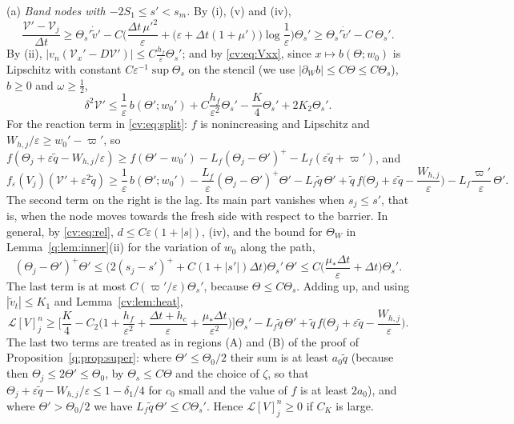 \documentclass[11pt]{amsart}
\theoremstyle{definition}
\theoremstyle{remark}
\newcommand{\ve}{\varepsilon}
\newcommand{\Lop}{\mathcal{L}}
\begin{document}
\smallskip
(a) \emph{Band nodes with $-2S_1\le s'<s_m$.} By (i), (v) and (iv),
\[
\frac{\mathcal V'-\mathcal V_j}{\Delta t}\ge\Theta_s'\dot{\tilde v}'-C\Big(\frac{\Delta t\,\mu'^2}\ve+\big(\ve+\Delta t(1+\mu')\big)\log\frac1\ve\Big)\Theta_s'
\ge\Theta_s'\dot{\tilde v}'-C\,\Theta_s' .
\]
By (ii), $|v_n(\mathcal V_x'-D\mathcal V')|\le C\frac{h_f}\ve\Theta_s'$; and by \eqref{cv:eq:Vxx}, since
$x\mapsto b(\Theta;w_0)$ is Lipschitz with constant $C\ve^{-1}\sup\Theta_s$ on the stencil (we use
$|\partial_Wb|\le C\Theta\le C\Theta_s$), $b\ge0$ and $\omega\ge\frac12$,
\[
\delta^2\mathcal V'\le\frac1\ve\,b(\Theta';w_0')+C\frac{h_f}{\ve^2}\Theta_s'-\frac K4\Theta_s'+2K_2\Theta_s' .
\]
For the reaction term in \eqref{cv:eq:split}: $f$ is nonincreasing and Lipschitz and
$W_{h,j}/\ve\ge w_0'-\varpi'$, so
$f(\Theta_j+\ve\tilde q-W_{h,j}/\ve)\ge f(\Theta'-w_0')-L_f(\Theta_j-\Theta')^+-L_f(\ve\tilde q+\varpi')$, and
\[
f_\ve(V_j)(\mathcal V'+\ve^2\tilde q)
\ge\frac1\ve\,b(\Theta';w_0')-\frac{L_f}\ve(\Theta_j-\Theta')^+\Theta'-L_f\tilde q\,\Theta'+\tilde q\,f\Big(\Theta_j+\ve\tilde q-\frac{W_{h,j}}\ve\Big)
-L_f\frac{\varpi'}\ve\,\Theta' .
\]
The second term on the right is the lag. Its main part vanishes when $s_j\le s'$, that
is, when the
node moves towards the fresh side with respect to the barrier. In general, by
\eqref{cv:eq:rel}, $d\le C\ve(1+|s|)$, (iv), and the bound for $\Theta_W$ in
Lemma~\ref{q:lem:inner}(ii) for the variation of $w_0$ along the path,
\[
(\Theta_j-\Theta')^+\Theta'\le\Big(2(s_j-s')^++C(1+|s'|)\Delta t\Big)\Theta_s'\,\Theta'
\le C\Big(\frac{\mu_*\Delta t}\ve+\Delta t\Big)\Theta_s' .
\]
The last term is at most $C(\varpi'/\ve)\Theta_s'$, because $\Theta\le C\Theta_s$. Adding up, and using
$|\tilde v_t|\le K_1$ and Lemma~\ref{cv:lem:heat},
\[
\Lop[V]^n_j\ge\Big[\frac K4-C_2\Big(1+\frac{h_f}{\ve^2}+\frac{\Delta t+h_c}\ve+\frac{\mu_*\Delta t}{\ve^2}\Big)\Big]\Theta_s'
-L_f\tilde q\,\Theta'+\tilde q\,f\Big(\Theta_j+\ve\tilde q-\frac{W_{h,j}}\ve\Big).
\]
The last two terms are treated as in regions (A) and (B) of the proof of
Proposition~\ref{q:prop:super}: where $\Theta'\le\Theta_0/2$ their sum is at least $a_0\tilde q$
(because then $\Theta_j\le2\Theta'\le\Theta_0$, by $\Theta_s\le C\Theta$ and the choice of $\zeta$, so that
$\Theta_j+\ve\tilde q-W_{h,j}/\ve\le1-\delta_1/4$ for $c_0$ small and the value of $f$ is at least $2a_0$), and
where $\Theta'>\Theta_0/2$ we have $L_f\tilde q\,\Theta'\le C\Theta_s'$. Hence $\Lop[V]^n_j\ge0$ if $C_K$ is large.
\end{document}
